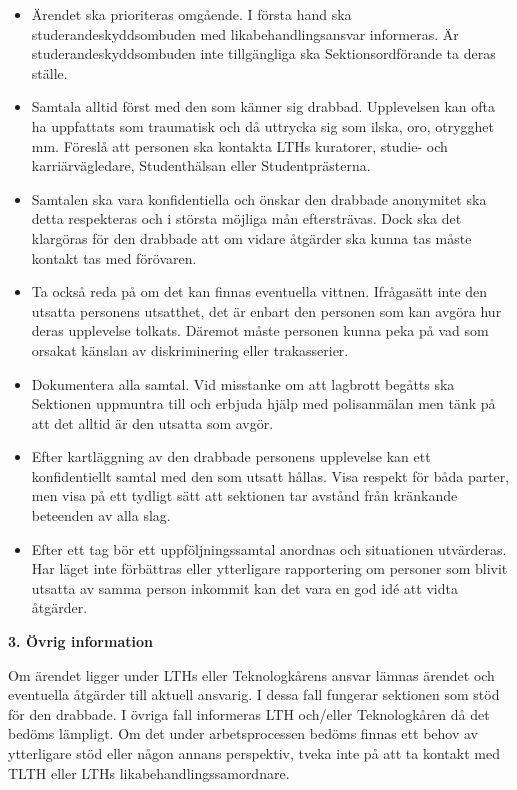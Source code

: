 \documentclass[../_main/handlingar.tex]{subfiles}
\begin{document}
\begin{itemize}
    \item Ärendet ska prioriteras omgående. I första hand ska studerandeskyddsombuden med likabehandlingsansvar informeras. Är studerandeskyddsombuden inte tillgängliga ska Sektionsordförande ta deras ställe.
    \item Samtala alltid först med den som känner sig drabbad. Upplevelsen kan ofta ha uppfattats som traumatisk och då uttrycka sig som ilska, oro, otrygghet mm. Föreslå att personen ska kontakta LTHs kuratorer, studie- och karriärvägledare, Studenthälsan eller Studentprästerna.
    \item Samtalen ska vara konfidentiella och önskar den drabbade anonymitet ska detta respekteras och i största möjliga mån eftersträvas. Dock ska det klargöras för den drabbade att om vidare åtgärder ska kunna tas måste kontakt tas med förövaren.
    \item Ta också reda på om det kan finnas eventuella vittnen. Ifrågasätt inte den utsatta personens utsatthet, det är enbart den personen som kan avgöra hur deras upplevelse tolkats. Däremot måste personen kunna peka på vad som orsakat känslan av diskriminering eller trakasserier.
    \item Dokumentera alla samtal. Vid misstanke om att lagbrott begåtts ska Sektionen uppmuntra till och erbjuda hjälp med polisanmälan men tänk på att det alltid är den utsatta som avgör.
    \item Efter kartläggning av den drabbade personens upplevelse kan ett konfidentiellt samtal med den som utsatt hållas. Visa respekt för båda parter, men visa på ett tydligt sätt att sektionen tar avstånd från kränkande beteenden av alla slag.
    \item Efter ett tag bör ett uppföljningssamtal anordnas och situationen utvärderas. Har läget inte förbättras eller ytterligare rapportering om personer som blivit utsatta av samma person inkommit  kan det vara en god idé att vidta åtgärder.
\end{itemize}

{\large \textbf{3. Övrig information}}

Om ärendet ligger under LTHs eller Teknologkårens ansvar lämnas ärendet och eventuella åtgärder till aktuell ansvarig. I dessa fall fungerar sektionen som stöd för den drabbade. I övriga fall informeras LTH och/eller Teknologkåren då det bedöms lämpligt. Om det under arbetsprocessen bedöms finnas ett behov av ytterligare stöd eller någon annans perspektiv, tveka inte på att ta kontakt med TLTH eller LTHs likabehandlingssamordnare.
\end{document}
